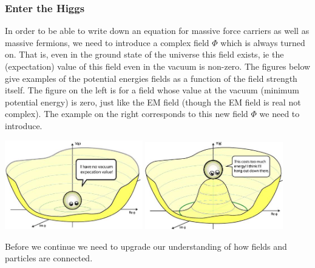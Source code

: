 \subsubsection{Enter the Higgs}
In order to be able to write down an equation for massive force carriers as well as massive fermions, we need to introduce a complex field $\Phi$ which is always turned on. That is, even in the ground state of the universe this field exists, ie the (expectation) value of this field even in the vacuum is non-zero. 
The figures below give examples of the potential energies fields as a function of the field strength itself. The figure on the left is for a field whose value at the vacuum (minimum potential energy) is zero, just like the EM field (though the EM field is real not complex). The example on the right corresponds to this new field $\Phi$ we need to introduce.
\begin{center}
\includegraphics[width=0.45\textwidth]{fig/higgs/phi_stable.JPG}
\includegraphics[width=0.45\textwidth]{fig/higgs/phi_unstable.JPG}
\end{center}

Before we continue we need to upgrade our understanding of how fields and particles are connected.
